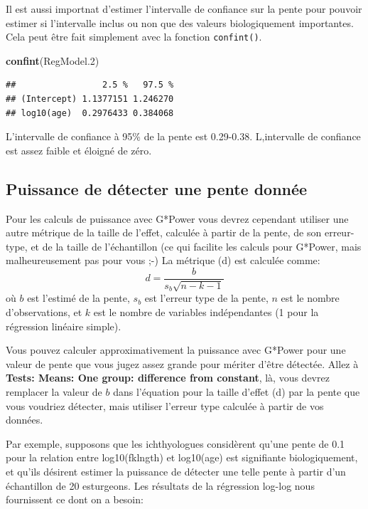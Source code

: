 \documentclass[
  12pt,
]{book}
\newenvironment{Shaded}{\begin{snugshade}}{\end{snugshade}}
\newcommand{\FloatTok}[1]{\textcolor[rgb]{0.00,0.00,0.81}{#1}}
\newcommand{\KeywordTok}[1]{\textcolor[rgb]{0.13,0.29,0.53}{\textbf{#1}}}
\newcommand{\NormalTok}[1]{#1}
\begin{document}
Il est aussi importnat d'estimer l'intervalle de confiance sur la pente pour pouvoir estimer si l'intervalle inclus ou non que des valeurs biologiquement importantes. Cela peut être fait simplement avec la fonction \texttt{confint()}.

\begin{Shaded}
\begin{Highlighting}[]
\KeywordTok{confint}\NormalTok{(RegModel}\FloatTok{.2}\NormalTok{)}
\end{Highlighting}
\end{Shaded}

\begin{verbatim}
##                 2.5 %   97.5 %
## (Intercept) 1.1377151 1.246270
## log10(age)  0.2976433 0.384068
\end{verbatim}

L'intervalle de confiance à 95\% de la pente est 0.29-0.38. L,intervalle de confiance est assez faible et éloigné de zéro.

\hypertarget{puissance-de-duxe9tecter-une-pente-donnuxe9e}{%
\subsection{Puissance de détecter une pente donnée}\label{puissance-de-duxe9tecter-une-pente-donnuxe9e}}

Pour les calculs de puissance avec G*Power vous devrez cependant utiliser une autre métrique de la taille de l'effet, calculée à partir de la pente, de son erreur-type, et de la taille de l'échantillon (ce qui facilite les calculs pour G*Power, mais malheureusement pas pour vous ;-) La métrique (d) est calculée comme:
\[ d = \frac{b}{s_b\sqrt{n-k-1}} \]
où \(b\) est l'estimé de la pente, \(s_b\) est l'erreur type de la pente, \(n\) est le nombre d'observations, et \(k\) est le nombre de variables indépendantes (1 pour la régression linéaire simple).

Vous pouvez calculer approximativement la puissance avec G*Power pour une valeur de pente que vous jugez assez grande pour mériter d'être détectée. Allez à \textbf{Tests: Means: One group: difference from constant}, là, vous devrez remplacer la valeur de \(b\) dans l'équation pour la taille d'effet (d) par la pente que vous voudriez détecter, mais utiliser l'erreur type calculée à partir de vos données.

Par exemple, supposons que les ichthyologues considèrent qu'une pente de 0.1 pour la relation entre log10(fklngth) et log10(age) est signifiante biologiquement, et qu'ils désirent estimer la puissance de détecter une telle pente à partir d'un échantillon de 20 esturgeons. Les résultats de la régression log-log nous fournissent ce dont on a besoin:
\end{document}
